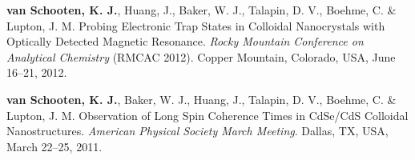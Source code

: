 \documentclass[11pt,letterpaper]{article}
\begin{document}
\begin{bibenum}
	\item \textbf{van Schooten, K. J.}, Huang, J., Baker, W. J., Talapin, D. V., Boehme, C. \& Lupton, J. M. Probing Electronic Trap States in Colloidal Nanocrystals with Optically Detected Magnetic Resonance. \textit{Rocky Mountain Conference on Analytical Chemistry} (RMCAC 2012). Copper Mountain, Colorado, USA, June 16--21, 2012.
	
	\item \textbf{van Schooten, K. J.}, Baker, W. J., Huang, J., Talapin, D. V., Boehme, C. \& Lupton, J. M. Observation of Long Spin Coherence Times in CdSe/CdS Colloidal Nanostructures. \textit{American Physical Society March Meeting}. Dallas, TX, USA, March 22--25, 2011.

\end{bibenum}
\vspace{\baselineskip} %
\end{document}
